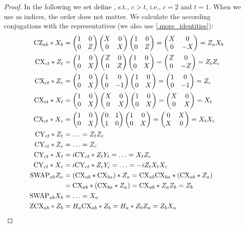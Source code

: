 \documentclass[a4paper,english]{scrartcl}
\begin{document}
\begin{proof}
In the following we set define \en[c, t], s.t., $c > t$, i.e., $c=2$ and $t=1$. When we
use \en[a, b] as indices, the order does not matter. We
calculate the according conjugations with the representatives (we also use
\cref{.more_identities}):
\begin{align}
  \cz_{ab}*X_b &= \matp{1&0\\0&Z} \matp{X&0\\0&X} \matp{1&0\\0&Z} =
  \matp{X&0\\0&-X} = Z_aX_b\\
  \cx_{ct}*Z_t &= \matp{1&0\\0&X} \matp{Z&0\\0&Z} \matp{1&0\\0&X} =
  \matp{Z&0\\0&-Z} = Z_tZ_c\\
  \cx_{ct}*Z_c &= \matp{1&0\\0&X} \matp{1&0\\0&-1} \matp{1&0\\0&X} =
  \matp{1&0\\0&-1} = Z_c\\
  \cx_{ct}*X_t &= \matp{1&0\\0&X} \matp{X&0\\0&X} \matp{1&0\\0&X} =
  \matp{X&0\\0&X} = X_t\\
  \cx_{ct}*X_c &= \matp{1&0\\0&X} \matp{0&1\\1&0} \matp{1&0\\0&X} =
  \matp{0&X\\X&0} = X_tX_c\\
  \cy_{ct}*Z_t &= \ldots = Z_tZ_c\\
  \cy_{ct}*Z_c &= \ldots = Z_c\\
  \cy_{ct}*X_t &= i\cy_{ct}*Z_tY_t = \ldots = X_tZ_c\\
  \cy_{ct}*X_c &= i\cy_{ct}*Z_cY_c = \ldots = -iZ_tX_tX_c\\
  \Swap_{ab}Z_a &= (\cx_{ab} * \cx_{ba}) * Z_a = \cx_{ab} \cx_{ba} * (\cx_{ab} * Z_a)\\
  &= \cx_{ab} * (\cx_{ba} * Z_a) = \cx_{ab} * Z_a Z_b = Z_b\\
  \Swap_{ab}X_b &= \ldots = X_a\\
  \zcx_{ab}*Z_b &= H_a\cx_{ab} * Z_b = H_a * Z_bZ_a = Z_bX_a\\

\end{align}
\end{proof}
\end{document}
